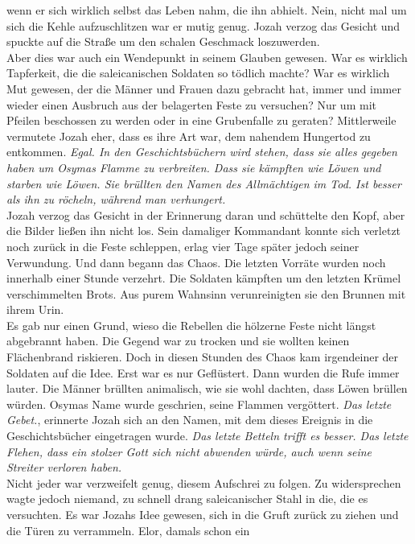 wenn er sich wirklich selbst das Leben nahm, die ihn abhielt. Nein, nicht mal um sich 
die Kehle aufzuschlitzen war er mutig genug. Jozah verzog das Gesicht und spuckte auf die Straße um 
den schalen Geschmack loszuwerden.\\
Aber dies war auch ein Wendepunkt in seinem Glauben gewesen. War es wirklich Tapferkeit, die die 
saleicanischen Soldaten so tödlich machte? War es wirklich Mut gewesen, der die Männer und Frauen 
dazu gebracht hat, immer und immer wieder einen Ausbruch aus der belagerten Feste zu versuchen? Nur 
um mit Pfeilen beschossen zu werden oder in eine Grubenfalle zu geraten? Mittlerweile vermutete 
Jozah eher, dass es ihre Art war, dem nahendem Hungertod zu entkommen. \textit{Egal. In den 
Geschichtsbüchern wird stehen, dass sie alles gegeben haben um Osymas Flamme zu verbreiten. Dass 
sie kämpften wie Löwen und starben wie Löwen. Sie brüllten den Namen des Allmächtigen im Tod. Ist 
besser als ihn zu röcheln, während man verhungert.}\\
Jozah verzog das Gesicht in der Erinnerung daran und schüttelte den Kopf, aber die Bilder ließen 
ihn nicht los. Sein damaliger Kommandant konnte sich verletzt noch zurück in die Feste schleppen, 
erlag vier Tage später jedoch seiner Verwundung. Und dann begann das Chaos. Die letzten Vorräte 
wurden noch innerhalb einer Stunde verzehrt. Die Soldaten kämpften um den letzten Krümel 
verschimmelten Brots. Aus purem Wahnsinn verunreinigten sie den Brunnen mit ihrem Urin.\\
Es gab nur einen Grund, wieso die Rebellen die hölzerne Feste nicht längst abgebrannt haben. Die 
Gegend war zu trocken und sie wollten keinen Flächenbrand riskieren. Doch in diesen Stunden des 
Chaos kam irgendeiner der Soldaten auf die Idee. Erst war es nur Geflüstert. Dann wurden die Rufe 
immer lauter. Die Männer brüllten animalisch, wie sie wohl dachten, dass Löwen brüllen würden. 
Osymas Name wurde geschrien, seine Flammen vergöttert. \textit{Das letzte Gebet.}, erinnerte Jozah 
sich an den Namen, mit dem dieses Ereignis in die Geschichtsbücher eingetragen wurde. \textit{Das 
letzte Betteln trifft es besser. Das letzte Flehen, dass ein stolzer Gott sich nicht abwenden 
würde, auch wenn seine Streiter verloren haben.}\\
Nicht jeder war verzweifelt genug, diesem Aufschrei zu folgen. Zu widersprechen wagte jedoch 
niemand, zu schnell drang saleicanischer Stahl in die, die es versuchten. Es war Jozahs Idee 
gewesen, sich in die Gruft zurück zu ziehen und die Türen zu verrammeln. Elor, damals schon ein 
